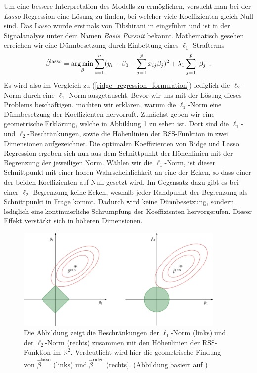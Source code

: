 Um eine bessere Interpretation des Modells zu ermöglichen, versucht man bei der \textit{Lasso} Regression eine Lösung zu finden, bei welcher viele Koeffizienten gleich Null sind. Das Lasso wurde erstmals von Tibshirani in \cite{tibshirani_lasso} eingeführt und ist in der Signalanalyse unter dem Namen \textit{Basis Pursuit} \cite{chen} bekannt. Mathematisch gesehen erreichen wir eine Dünnbesetzung durch Einbettung eines $\ell_1$-Strafterms
\begin{align}
\label{lasso_formulation}
\hat{\beta}^{\text{lasso}} = \operatorname*{arg\,min}_{\beta} \sum_{i=1}^{n}(y_i - \beta_0 - \sum_{j=1}^p x_{ij}\beta_j)^2 + \lambda_1\sum_{j=1}^p \left|\beta_j\right|.
\end{align}
Es wird also im Vergleich zu (\ref{ridge_regression_formulation}) lediglich die $\ell_2$-Norm durch eine $\ell_1$-Norm ausgetauscht. Bevor wir uns mit der Lösung dieses Problems beschäftigen, möchten wir erklären, warum die $\ell_1$-Norm eine Dünnbesetzung der Koeffizienten hervorruft. Zunächst geben wir eine geometrische Erklärung, welche in Abbildung \ref{lasso_ridge_regression_figure} zu sehen ist. Dort sind die $\ell_1$- und $\ell_2$-Beschränkungen, sowie die Höhenlinien der RSS-Funktion in zwei Dimensionen aufgezeichnet. Die optimalen Koeffizienten von Ridge und Lasso Regression ergeben sich nun aus dem Schnittpunkt der Höhenlinien mit der Begrenzung der jeweiligen Norm. Wählen wir die $\ell_1$-Norm, ist dieser Schnittpunkt mit einer hohen Wahrscheinlichkeit an eine der Ecken, so dass einer der beiden Koeffizienten auf Null gesetzt wird. Im Gegensatz dazu gibt es bei einer $\ell_2$-Begrenzung keine Ecken, weshalb jeder Randpunkt der Begrenzung als Schnittpunkt in Frage kommt. Dadurch wird keine Dünnbesetzung, sondern lediglich eine kontinuierliche Schrumpfung der Koeffizienten hervorgerufen. Dieser Effekt verstärkt sich in höheren Dimensionen.

\begin{figure}
\centering
\includegraphics[width = 0.9\textwidth]{figures/lasso_ridge_regression.jpg}
\caption{Die Abbildung zeigt die Beschränkungen der $\ell_1$-Norm (links) und der $\ell_2$-Norm (rechts) zusammen mit den Höhenlinien der RSS-Funktion im $\mathbb{R}^2$. Verdeutlicht wird hier die geometrische Findung von $\hat{\beta}^{\text{lasso}}$ (links) und $\hat{\beta}^{\text{ridge}}$ (rechts). (Abbildung basiert auf \cite{hastie_elements})}
\label{lasso_ridge_regression_figure}
\end{figure}

